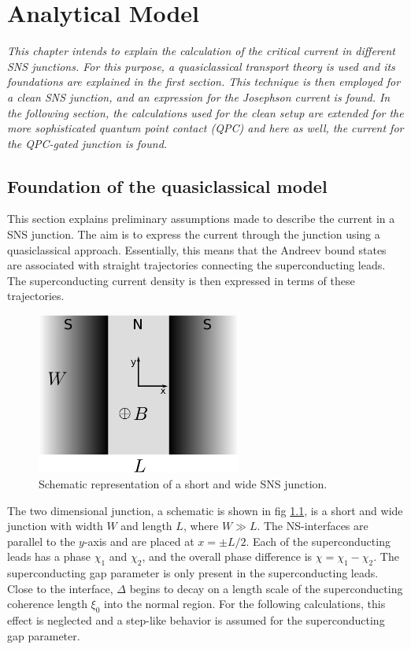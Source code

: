 \chapter{Analytical Model}
\label{ch:analyticalmodel}
\textit{This chapter intends to explain the calculation of the critical current in different SNS junctions. For this purpose, a quasiclassical transport theory is used and its foundations are explained in the first section. This technique is then employed for a clean SNS junction, and an expression for the Josephson current is found. In the following section, the calculations used for the clean setup are extended for the more sophisticated quantum point contact (QPC) and here as well, the current for the QPC-gated junction is found.}

\section{Foundation of the quasiclassical model}
This section explains preliminary assumptions made to describe the current in a SNS junction. The aim is to express the current through the junction using a quasiclassical approach. Essentially, this means that the Andreev bound states are associated with straight trajectories connecting the superconducting leads. The superconducting current density is then expressed in terms of these trajectories.
\begin{figure}[h]
\centering	
\includegraphics[width=0.6\textwidth]{figure/analyticalmodel/sns_junction}
\caption{Schematic representation of a short and wide SNS junction.}
\label{fig:sns_schematic}
\end{figure}
The two dimensional junction, a schematic is shown in fig \ref{fig:sns_schematic}, is a short and wide junction with width $W$ and length $L$, where $W \gg L$. The NS-interfaces are parallel to the $y$-axis and are placed at $x = \pm L/2$. Each of the superconducting leads has a phase $\chi_{1}$ and $\chi_{2}$, and the overall phase difference is $\chi = \chi_{1} - \chi_{2}$. The superconducting gap parameter is only present in the superconducting leads. Close to the interface, $\Delta$ begins to decay on a length scale of the superconducting coherence length $\xi_0$  into the normal region. For the following calculations, this effect is neglected and a step-like behavior is assumed for the superconducting gap parameter.
